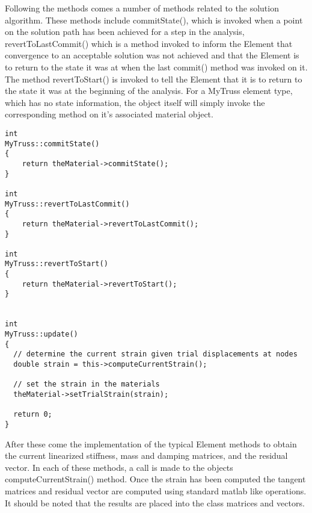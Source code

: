 \documentclass[12pt]{article}
\begin{document}
Following the methods comes a number of methods related to the
solution algorithm. These methods include {\sf commitState()}, which
is invoked when a point on the solution path has been achieved for a
step in the analysis, {\sf revertToLastCommit()} which is a method
invoked to inform the Element that convergence to an acceptable
solution was not achieved and that the Element is to return to the
state it was at when the last {\sf commit()} method was invoked on
it.  The method {\sf revertToStart()} is invoked to tell the Element
that it is to return to the state it was at the beginning of the
analysis. For a MyTruss element type, which has no state information,
the object itself will simply invoke the corresponding method on it's
associated material object.

{\sf\small
\begin{verbatim}
int
MyTruss::commitState()
{
    return theMaterial->commitState();
}

int
MyTruss::revertToLastCommit()
{
    return theMaterial->revertToLastCommit();
}

int
MyTruss::revertToStart()
{
    return theMaterial->revertToStart();
}


int
MyTruss::update()
{
  // determine the current strain given trial displacements at nodes
  double strain = this->computeCurrentStrain();

  // set the strain in the materials
  theMaterial->setTrialStrain(strain);

  return 0;
}
\end{verbatim}
}

After these come the implementation of the typical Element methods to
obtain the current linearized stiffness, mass and damping matrices, and
the residual vector. In each of these methods, a call is made to the
objects {\sf computeCurrentStrain()} method. Once the strain has been
computed the tangent matrices and residual vector are computed using
standard matlab like operations. It should be noted that the results
are placed into the class matrices and vectors.
\end{document}
